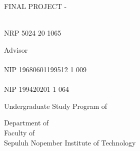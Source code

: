 \begin{large}
  FINAL PROJECT - \coursecode{}
\end{large}

\vspace{\fill}

\begin{spacing}{1.5}
  \begin{Large}
    \engtatitle
  \end{Large}
\end{spacing}

\vspace{\fill}

\begin{large}
  \name \\
  \textmd{NRP 5024 20 1065}
\end{large}

\vspace{\fill}

\begin{large}
  \textmd{Advisor} \\
  \advisor\\
  \textmd{NIP 19680601199512 1 009} \\
  \coadvisor \\
  \textmd{NIP 199420201 1 064}
\end{large}

\vspace{\fill}

Undergraduate Study Program of \engstudyprogram{} \\

\mdseries

Department of \engdepartment{} \\
Faculty of \engfaculty{} \\
Sepuluh Nopember Institute of Technology

\place{} \\ \the\year{}
